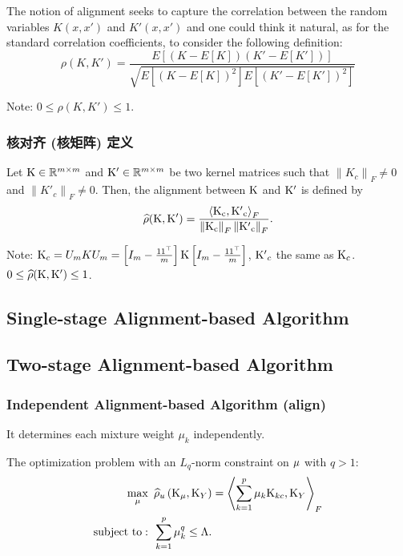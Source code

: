 \documentclass{ctexart}
\begin{document}
    The notion of alignment seeks to capture the correlation between the random variables $K(x, x')$ and $K'(x, x')$ and one could think it natural,
    as for the standard correlation coefficients, to consider the following definition:
    \begin{equation}
        \rho (K, {K'}) = \frac{E[(K-E[K])(K'-E[K'])]}{\sqrt{E[{(K-E[K])}^{2}]E[{(K'-E[K'])}^{2}]}}
    \end{equation}

    Note: $0\leq \rho(K, {K'})\leq 1$.

    \subsubsection{核对齐 (核矩阵) 定义}
    Let ${\rm K}\in{\mathbb{R}^{m\times m}}$ and ${\rm K'}\in{\mathbb{R}^{m\times m}}$ be two kernel matrices such that $\left\lVert K_c\right\rVert_F\neq 0$ and $\left\lVert {K'}_c\right\rVert_F\neq 0$.
    Then, the alignment between ${\rm K}$ and ${\rm K'}$ is defined by
    \begin{equation}
        \widehat{\rho}({\rm K}, {\rm K'}) = \frac{\left\langle {\rm K_c}, {\rm {K'}_c}\right\rangle_F}{\left\lVert {\rm K_c}\right\rVert_F \left\lVert {\rm {K'}_c}\right\rVert_F}.
    \end{equation}

    Note: ${\rm K}_c = U_{m}KU_{m} = \left[I_m - \frac{{\rm 1}{\rm 1}^{\top}}{m}\right]{\rm K}\left[I_m - \frac{{\rm 1}{\rm 1}^{\top}}{m}\right]$,
    ${\rm K'}_c$ the same as ${\rm K}_c$. $0\leq \widehat{\rho} ({\rm K}, {\rm K'})\leq 1$.

    \subsection{Single-stage Alignment-based Algorithm}

    \subsection{Two-stage Alignment-based Algorithm}

    \subsubsection{Independent Alignment-based Algorithm (align)}
    It determines each mixture weight $\mu_k$ independently.

    The optimization problem with an $L_q$-norm constraint on ${\rm \mu}$ with $q > 1$:
    \begin{equation}
        \begin{aligned}
            \max_{\mu} \,\,\,&\widehat{\rho}_{u}\left({\rm K_{\mu}}, {\rm K}_Y\right) = \left\langle \sum_{k = 1}^{p}\mu_{k}{\rm K}_{kc}, {\rm K}_Y\right\rangle_F \\  
            \text{subject to}: \,\,\,&\sum_{k = 1}^{p}\mu_{k}^q \leq \Lambda.   
        \end{aligned}
    \end{equation}
\end{document}
